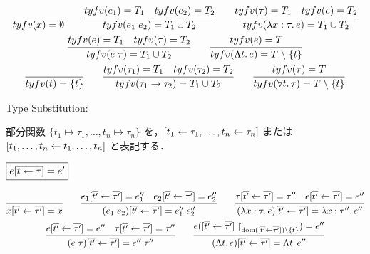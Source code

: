 \begin{gather*}
  \infer{\typefreevar(x) = \emptyset}{}
  \hspace{2em}
  \infer{\typefreevar(e_1\; e_2) = T_1 \cup T_2}{
    \typefreevar(e_1) = T_1
    &
    \typefreevar(e_2) = T_2
  }
  \hspace{2em}
  \infer{\typefreevar(\lambda x: \tau\ldotp e) = T_1 \cup T_2}{
    \typefreevar(\tau) = T_1
    &
    \typefreevar(e) = T_2
  }
  \\
  \infer{\typefreevar(e\; \tau) = T_1 \cup T_2}{
    \typefreevar(e) = T_1
    &
    \typefreevar(\tau) = T_2
  }
  \hspace{2em}
  \infer{\typefreevar(\Lambda t\ldotp e) = T \rcomplement \{t\}}{
    \typefreevar(e) = T
  }
  \\
  \infer{\typefreevar(t) = \{t\}}{}
  \hspace{2em}
  \infer{\typefreevar(\tau_1 \to \tau_2) = T_1 \cup T_2}{
    \typefreevar(\tau_1) = T_1
    &
    \typefreevar(\tau_2) = T_2
  }
  \hspace{2em}
  \infer{\typefreevar(\forall t\ldotp \tau) = T \rcomplement \{t\}}{
    \typefreevar(\tau) = T
  }
\end{gather*}

Type Substitution:

部分関数 $\{t_1 \mapsto \tau_1, \ldots, t_n \mapsto \tau_n\}$ を，$[t_1 \gets \tau_1, \ldots, t_n \gets \tau_n]$ または $[t_1, \ldots, t_n \gets t_1, \ldots, t_n]$ と表記する．

$\fbox{$e[\overline{t \gets \tau}] = e'$}$

\begin{gather*}
  \infer{x[\overline{t'} \assign \overline{\tau'}] = x}{}
  \hspace{2em}
  \infer{(e_1\; e_2)[\overline{t'} \assign \overline{\tau'}] = e''_1\; e''_2}{
    e_1[\overline{t'} \assign \overline{\tau'}] = e''_1
    &
    e_2[\overline{t'} \assign \overline{\tau'}] = e''_2
  }
  \hspace{2em}
  \infer{(\lambda x: \tau\ldotp e)[\overline{t'} \assign \overline{\tau'}] = \lambda x: \tau''\ldotp e''}{
    \tau[\overline{t'} \assign \overline{\tau'}] = \tau''
    &
    e[\overline{t'} \assign \overline{\tau'}] = e''
  }
  \\
  \infer{(e\; \tau)[\overline{t'} \assign \overline{\tau'}] = e''\; \tau''}{
    e[\overline{t'} \assign \overline{\tau'}] = e''
    &
    \tau[\overline{t'} \assign \overline{\tau'}] = \tau''
  }
  \hspace{2em}
  \infer{(\Lambda t\ldotp e)[\overline{t'} \assign \overline{\tau'}] = \Lambda t\ldotp e''}{
    e([\overline{t'} \assign \overline{\tau'}]\restrict_{\dom([\overline{t'} \assign \overline{\tau'}]) \rcomplement \{t\}}) = e''
  }
\end{gather*}

